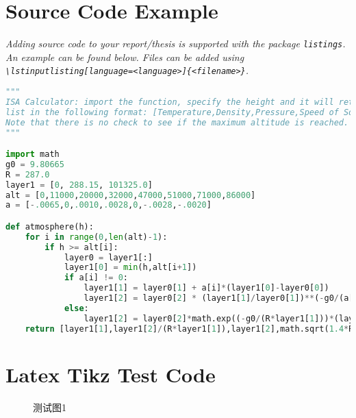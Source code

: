 \chapter{Source Code Example}

\emph{Adding source code to your report/thesis is supported with the package {\normalfont\texttt{listings}}. An example can be found below. Files can be added using {\normalfont\texttt{\textbackslash lstinputlisting[language=<language>]\{<filename>\}}}.}

\begin{lstlisting}[language=Python]
"""
ISA Calculator: import the function, specify the height and it will return a
list in the following format: [Temperature,Density,Pressure,Speed of Sound].
Note that there is no check to see if the maximum altitude is reached.
"""

import math
g0 = 9.80665
R = 287.0
layer1 = [0, 288.15, 101325.0]
alt = [0,11000,20000,32000,47000,51000,71000,86000]
a = [-.0065,0,.0010,.0028,0,-.0028,-.0020]

def atmosphere(h):
    for i in range(0,len(alt)-1):
        if h >= alt[i]:
            layer0 = layer1[:]
            layer1[0] = min(h,alt[i+1])
            if a[i] != 0:
                layer1[1] = layer0[1] + a[i]*(layer1[0]-layer0[0])
                layer1[2] = layer0[2] * (layer1[1]/layer0[1])**(-g0/(a[i]*R))
            else:
                layer1[2] = layer0[2]*math.exp((-g0/(R*layer1[1]))*(layer1[0]-layer0[0]))
    return [layer1[1],layer1[2]/(R*layer1[1]),layer1[2],math.sqrt(1.4*R*layer1[1])]
\end{lstlisting}


\chapter{Latex Tikz Test Code}
\begin{figure}[H]
        \caption{测试图1}
    \end{figure}
    

